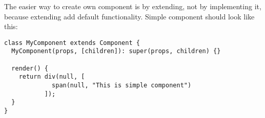 \documentclass[oneside, 12pt]{book}
\begin{document}
\iffalse
\begin{verbatim}
class Component {
  
  /**
   * props of component
   */
  dynamic props;
  
  List<ComponentDescription> children;

  /**
   * stream controller used to signalize to node, 
   * when component need to be udpated
   */
  final StreamController _needUpdateController;

  /**
   * Offer stream which will create event everytime, when it need to be updated (rendered).
   * 
   * Stream use boolean data, which tells, if update should be done immediately
   */
  Stream<bool> get needUpdate => _needUpdateController.stream; 

  /**
   * constructor, it create component with setted stream controller. 
   * 
   * If stream was not passed, it will create own stream controller
   */
  Component(this.props, [this.children]): 
    this._needUpdateController = new StreamController<bool>() {}
  
  didMount() {}

  willReceiveProps(dynamic newProps) {}
  
  shouldUpdate(dynamic newProps, dynamic oldProps) => true;
  
  List<ComponentDescription> render() {}
  
  didUpdate() {}
  
  willUnmount() {}
  
  /**
   * redraw will add event to stream
   */
  redraw([bool now = false]) {
    _needUpdateController.add(now);
  }
}
\end{verbatim}
\fi



    The easier way to create own component is by extending, not by implementing it, because extending add default functionality. 
    Simple component should look like this:
\begin{verbatim}
class MyComponent extends Component {
  MyComponent(props, [children]): super(props, children) {}

  render() {
    return div(null, [
             span(null, "This is simple component")
           ]);
  }
}
\end{verbatim}

\end{document}
